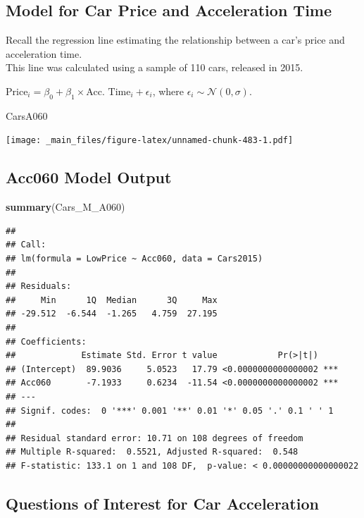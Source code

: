 \documentclass[]{book}
\newenvironment{Shaded}{\begin{snugshade}}{\end{snugshade}}
\newcommand{\KeywordTok}[1]{\textcolor[rgb]{0.13,0.29,0.53}{\textbf{#1}}}
\newcommand{\NormalTok}[1]{#1}
\begin{document}
\subsection{Model for Car Price and Acceleration
Time}\label{model-for-car-price-and-acceleration-time}

Recall the regression line estimating the relationship between a car's
price and acceleration time.\\
This line was calculated using a sample of 110 cars, released in 2015.

\(\text{Price}_i = \beta_0 + \beta_1\times\text{Acc. Time}_i + \epsilon_i\),
where \(\epsilon_i\sim\mathcal{N}(0, \sigma)\).

\begin{Shaded}
\begin{Highlighting}[]
\NormalTok{CarsA060}
\end{Highlighting}
\end{Shaded}

\texttt{[image: \_main\_files/figure-latex/unnamed-chunk-483-1.pdf]}

\subsection{Acc060 Model Output}\label{acc060-model-output}

\begin{Shaded}
\begin{Highlighting}[]
\KeywordTok{summary}\NormalTok{(Cars_M_A060)}
\end{Highlighting}
\end{Shaded}

\begin{verbatim}
## 
## Call:
## lm(formula = LowPrice ~ Acc060, data = Cars2015)
## 
## Residuals:
##     Min      1Q  Median      3Q     Max 
## -29.512  -6.544  -1.265   4.759  27.195 
## 
## Coefficients:
##             Estimate Std. Error t value            Pr(>|t|)    
## (Intercept)  89.9036     5.0523   17.79 <0.0000000000000002 ***
## Acc060       -7.1933     0.6234  -11.54 <0.0000000000000002 ***
## ---
## Signif. codes:  0 '***' 0.001 '**' 0.01 '*' 0.05 '.' 0.1 ' ' 1
## 
## Residual standard error: 10.71 on 108 degrees of freedom
## Multiple R-squared:  0.5521, Adjusted R-squared:  0.548 
## F-statistic: 133.1 on 1 and 108 DF,  p-value: < 0.00000000000000022
\end{verbatim}

\subsection{Questions of Interest for Car
Acceleration}\label{questions-of-interest-for-car-acceleration}
\end{document}
